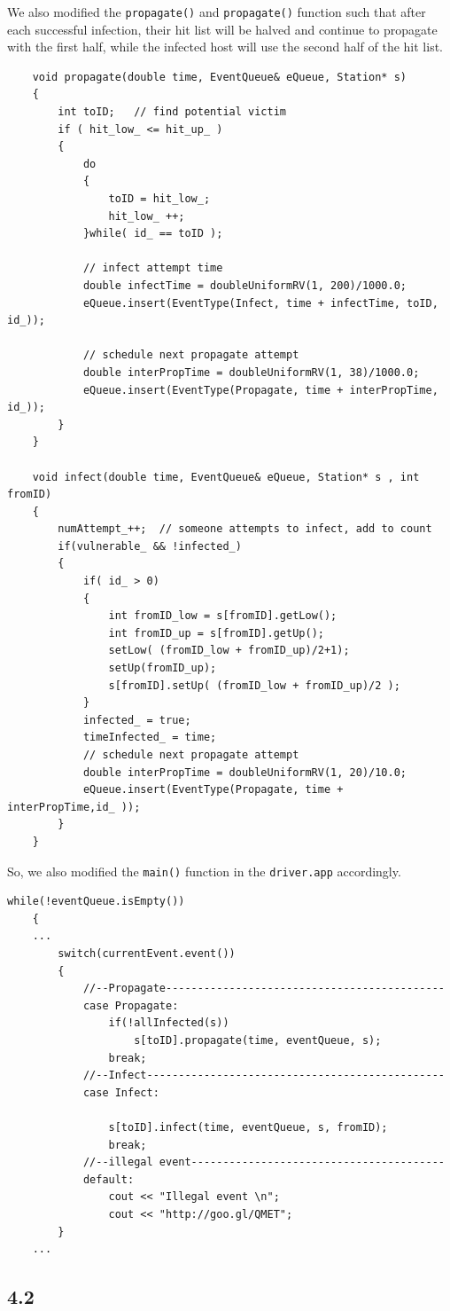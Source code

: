 \documentclass[10pt]{article}
\begin{document}
We also modified the \texttt{propagate()} and \texttt{propagate()} function such that after each successful infection, their hit list will be halved and continue to propagate with the first half, while the infected host will use the second half of the hit list.

\begin{lstlisting}
	void propagate(double time, EventQueue& eQueue, Station* s)
	{
		int toID;	// find potential victim
		if ( hit_low_ <= hit_up_ )
		{
			do
			{
				toID = hit_low_;
				hit_low_ ++;
			}while( id_ == toID );

			// infect attempt time
			double infectTime = doubleUniformRV(1, 200)/1000.0;
			eQueue.insert(EventType(Infect, time + infectTime, toID, id_));

			// schedule next propagate attempt
			double interPropTime = doubleUniformRV(1, 38)/1000.0;
			eQueue.insert(EventType(Propagate, time + interPropTime, id_));
		}
	}

	void infect(double time, EventQueue& eQueue, Station* s , int fromID)
	{
		numAttempt_++;  // someone attempts to infect, add to count
		if(vulnerable_ && !infected_)
		{	
			if( id_ > 0)
			{	
				int fromID_low = s[fromID].getLow();
				int fromID_up = s[fromID].getUp();
				setLow( (fromID_low + fromID_up)/2+1);
				setUp(fromID_up);
				s[fromID].setUp( (fromID_low + fromID_up)/2 );
			}
			infected_ = true;
			timeInfected_ = time;
			// schedule next propagate attempt
			double interPropTime = doubleUniformRV(1, 20)/10.0;
			eQueue.insert(EventType(Propagate, time + interPropTime,id_ ));
		}
	}
\end{lstlisting}

So, we also modified the \texttt{main()} function in the  \texttt{driver.app} accordingly.
\begin{lstlisting}
while(!eventQueue.isEmpty())
	{
    ...
		switch(currentEvent.event())
		{
			//--Propagate--------------------------------------------
			case Propagate:
				if(!allInfected(s))
					s[toID].propagate(time, eventQueue, s);
				break;
			//--Infect-----------------------------------------------
			case Infect:
				
				s[toID].infect(time, eventQueue, s, fromID);
				break;
			//--illegal event----------------------------------------
			default:
				cout << "Illegal event \n";
				cout << "http://goo.gl/QMET";
		}
    ...
\end{lstlisting}

\subsection*{4.2}
\end{document}
